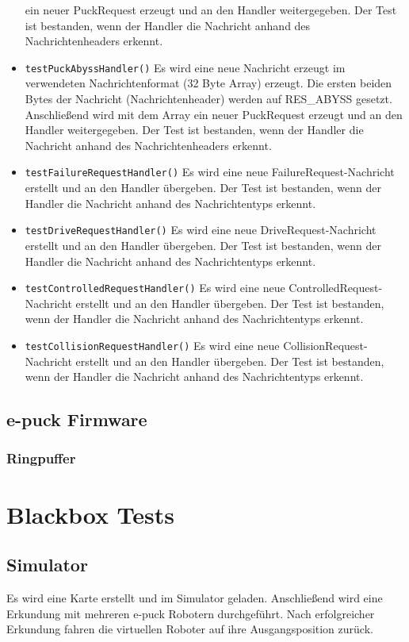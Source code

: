 \documentclass[10pt,a4paper]{article}
\begin{document}
\begin{itemize}
				ein neuer PuckRequest erzeugt und an den Handler weitergegeben.
				Der Test ist bestanden, wenn der Handler die Nachricht anhand des Nachrichtenheaders erkennt.
				\item \texttt{testPuckAbyssHandler()} Es wird eine neue Nachricht erzeugt im verwendeten Nachrichtenformat (32 Byte Array) erzeugt.
				Die ersten beiden Bytes der Nachricht (Nachrichtenheader) werden auf RES\_ABYSS gesetzt. Anschließend wird mit dem Array ein
				neuer PuckRequest erzeugt und an den Handler weitergegeben.
				Der Test ist bestanden, wenn der Handler die Nachricht anhand des Nachrichtenheaders erkennt.
				\item \texttt{testFailureRequestHandler()} Es wird eine neue FailureRequest-Nachricht erstellt und an den Handler übergeben. Der Test
				ist bestanden, wenn der Handler die Nachricht anhand des Nachrichtentyps erkennt.
				\item \texttt{testDriveRequestHandler()} Es wird eine neue DriveRequest-Nachricht erstellt und an den Handler übergeben. Der Test
				ist bestanden, wenn der Handler die Nachricht anhand des Nachrichtentyps erkennt.
				\item \texttt{testControlledRequestHandler()} Es wird eine neue ControlledRequest-Nachricht erstellt und an den Handler übergeben.
				Der Test ist bestanden, wenn der Handler die Nachricht anhand des Nachrichtentyps erkennt.
				\item \texttt{testCollisionRequestHandler()} Es wird eine neue CollisionRequest-Nachricht erstellt und an den Handler übergeben. Der
				Test ist bestanden, wenn der Handler die Nachricht anhand des Nachrichtentyps erkennt.
			\end{itemize}
		
		\subsection{e-puck Firmware}
		
			\subsubsection{Ringpuffer}
	
	\section{Blackbox Tests}
		\subsection{Simulator}
			Es wird eine Karte erstellt und im Simulator geladen. Anschlie\ss end wird eine Erkundung mit mehreren e-puck Robotern durchgef\"uhrt. Nach erfolgreicher
			Erkundung fahren die virtuellen Roboter auf ihre Ausgangsposition zur\"uck.
\end{document}
